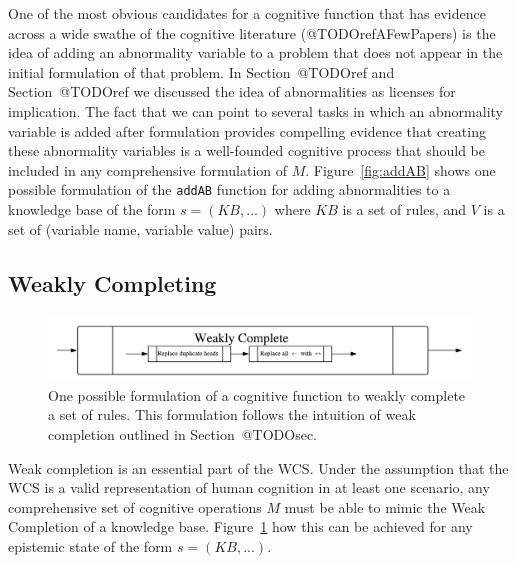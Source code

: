 \documentclass[
11pt, %
english, %
singlespacing, %
headsepline, %
]{MastersDoctoralThesis} %
\begin{document}
One of the most obvious candidates for a cognitive function that has evidence across a wide swathe of the cognitive literature (@TODOrefAFewPapers) is the idea of adding an abnormality variable to a problem that does not appear in the initial formulation of that problem. In Section~@TODOref and Section~@TODOref we discussed the idea of abnormalities as licenses for implication. The fact that we can point to several tasks in which an abnormality variable is added after formulation provides compelling evidence that creating these abnormality variables is a well-founded cognitive process that should be included in any comprehensive formulation of $M$. Figure~\ref{fig:addAB} shows one possible formulation of the \texttt{addAB} function for adding abnormalities to a knowledge base of the form $s=(KB,...)$ where $KB$ is a set of rules, and $V$ is a set of (variable name, variable value) pairs.



\subsection{Weakly Completing}
\begin{figure} 
\begin{center}
\includegraphics[width=\linewidth]{weaklycompleteSCP}
\end{center}
\caption{One possible formulation of a cognitive function to weakly complete a set of rules. This formulation follows the intuition of weak completion outlined in Section~@TODOsec.}
\label{fig:weaklycompleteSCP}
\end{figure}

Weak completion is an essential part of the WCS. Under the assumption that the WCS is a valid representation of human cognition in at least one scenario, any comprehensive set of cognitive operations $M$ must be able to mimic the Weak Completion of a knowledge base. Figure~\ref{fig:weaklycompleteSCP} how this can be achieved for any epistemic state of the form $s=(KB,...)$.
\end{document}
